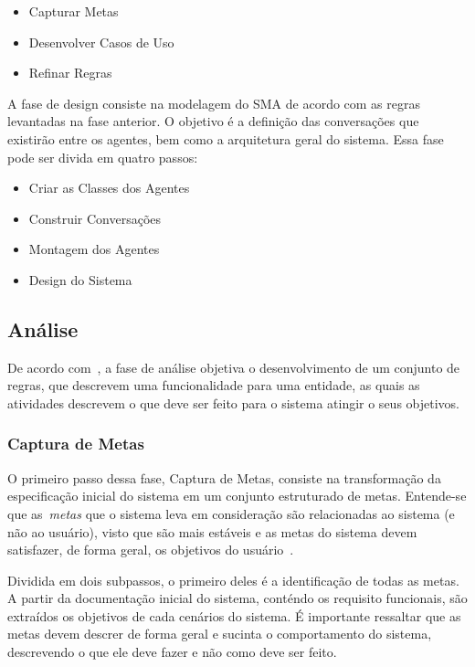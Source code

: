 \begin{itemize}
	\item Capturar Metas
	\item Desenvolver Casos de Uso
	\item Refinar Regras
\end{itemize}

A fase de design consiste na modelagem do SMA de acordo com as regras levantadas na fase anterior. O objetivo é a definição das conversações que existirão entre os agentes, bem como a arquitetura geral do sistema. Essa fase pode ser divida em quatro passos:

\begin{itemize}
	\item Criar as Classes dos Agentes
	\item Construir Conversações
	\item Montagem dos Agentes
	\item Design do Sistema
\end{itemize}

\subsection{Análise}

De acordo com~\cite{scott01}, a fase de análise objetiva o desenvolvimento de um conjunto de regras, que descrevem uma funcionalidade para uma entidade, as quais as atividades descrevem o que deve ser feito para o sistema atingir o seus objetivos.

\subsubsection{Captura de Metas}

O primeiro passo dessa fase, Captura de Metas, consiste na transformação da especificação inicial do sistema em um conjunto estruturado de metas. Entende-se que as~\emph{metas} que o sistema leva em consideração são relacionadas ao sistema (e não ao usuário), visto que são mais estáveis e as metas do sistema devem satisfazer, de forma geral, os objetivos do usuário~\cite{scott01}.

Dividida em dois subpassos, o primeiro deles é a identificação de todas as metas. A partir da documentação inicial do sistema, conténdo os requisito  funcionais, são extraídos os objetivos de cada cenários do sistema. É importante ressaltar que as metas devem descrer de forma geral e sucinta o comportamento do sistema, descrevendo o que ele deve fazer e não como deve ser feito.

